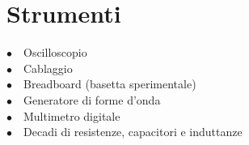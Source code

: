 

\section{Strumenti}

$\bullet \quad$Oscilloscopio \\
$\bullet \quad$Cablaggio\\
$\bullet \quad$Breadboard (basetta sperimentale)\\
$\bullet \quad$Generatore di forme d'onda\\
$\bullet \quad$Multimetro digitale\\
$\bullet \quad$Decadi di resistenze, capacitori e induttanze\\